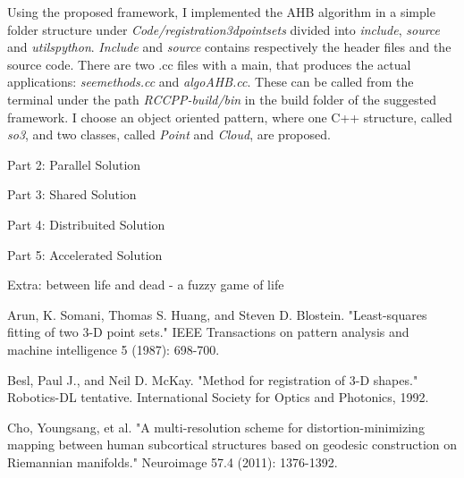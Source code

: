 \documentclass[11pt, twoside]{article}
\begin{document}
\noindent
Using the proposed framework, I implemented the AHB algorithm \cite{ahb_algo} in a simple folder structure under \emph{Code/registration\textunderscore3d\textunderscore point\textunderscore sets} divided into \emph{include}, \emph{source} and \emph{utils\textunderscore python}.
\emph{Include} and \emph{source} contains respectively the header files and the source code. There are two .cc files with a main, that produces the actual applications: \emph{see\textunderscore methods.cc} and \emph{algo\textunderscore AHB.cc}. These can be called from the terminal under the path \emph{RCCPP-build/bin} in the build folder of the suggested framework. I choose an object oriented pattern, where one C++ structure, called \emph{so3}, and two classes, called \emph{Point} and \emph{Cloud}, are proposed. \\



\begin{center}
	\color{MidnightBlue} {\Large Part 2: Parallel Solution }\color{Black} 
\end{center}



\begin{center}
	\color{MidnightBlue} {\Large Part 3: Shared Solution }\color{Black} 
\end{center}



\begin{center}
	\color{MidnightBlue} {\Large Part 4: Distribuited Solution }\color{Black} 
\end{center}



\begin{center}
	\color{MidnightBlue} {\Large Part 5: Accelerated Solution }\color{Black} 
\end{center}

\begin{center}
	\color{MidnightBlue} {\Large Extra: between life and dead - a fuzzy game of life }\color{Black} 
\end{center}


\begin{thebibliography}{2}
	
	Arun, K. Somani, Thomas S. Huang, and Steven D. Blostein. "Least-squares fitting of two 3-D point sets." IEEE Transactions on pattern analysis and machine intelligence 5 (1987): 698-700.
	
	Besl, Paul J., and Neil D. McKay. "Method for registration of 3-D shapes." Robotics-DL tentative. International Society for Optics and Photonics, 1992.
	
	Cho, Youngsang, et al. "A multi-resolution scheme for distortion-minimizing mapping between human subcortical structures based on geodesic construction on Riemannian manifolds." Neuroimage 57.4 (2011): 1376-1392.	
\end{thebibliography}
\end{document}
